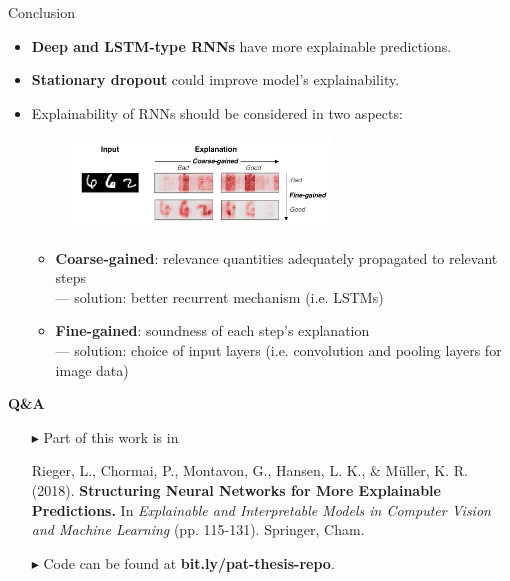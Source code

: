 \documentclass[Nike]{tuberlinbeamer}
\begin{document}
\begin{frame}{Conclusion}

\begin{itemize}
	\item \textbf{Deep and LSTM-type RNNs} have more explainable predictions.
	\item \textbf{Stationary dropout} could improve model's explainability.
	\item Explainability of RNNs should be considered in two aspects:
	 \begin{figure}[h]
	\includegraphics [width=0.65\textwidth]{figures/present_coarse_fine_aspects}
\end{figure}
		\begin{itemize}
			\item \textbf{Coarse-gained}: relevance quantities adequately propagated to relevant steps \\
					--- solution: better recurrent mechanism (i.e. LSTMs)
			\item \textbf{Fine-gained}: soundness of each step's explanation\\
					--- solution: choice of input layers (i.e. convolution and pooling layers for image data)
		\end{itemize}
\end{itemize}
\end{frame}


\begin{frame}{}
\vfill 
\begin{center}
\LARGE \textbf{Q\&A}	
\end{center}

\vfill


\begin{itemize}
	\item[$\blacktriangleright$] Part of this work is in \\
{ \small \vspace{0.2cm}

Rieger, L., Chormai, P., Montavon, G., Hansen, L. K., \& Müller, K. R. (2018). \textbf{Structuring Neural Networks for More Explainable Predictions.} In \textit{Explainable and Interpretable Models in Computer Vision and Machine Learning} (pp. 115-131). Springer, Cham.
} 

	\item[$\blacktriangleright$] Code can be found at \textbf{bit.ly/pat-thesis-repo}.
\end{itemize}


\end{frame}
\end{document}
